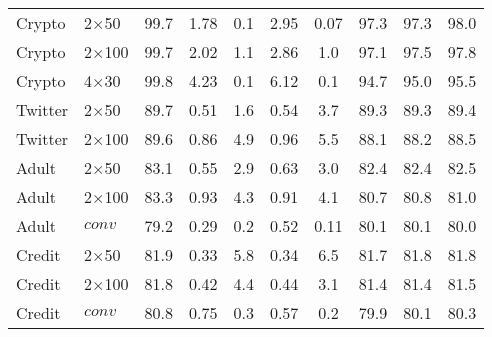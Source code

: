 {\begin{table}[t]
\begin{center}
\begin{tabular}{lll ccccccc}
\midrule
Crypto   & 2$\times$50    &  99.7   &    1.78&  0.1   & 2.95  & 0.07           & 97.3    &   97.3 &   98.0            \\ 
Crypto   & 2$\times$100    &  99.7   &    2.02& 1.1   & 2.86 & 1.0            & 97.1    &   97.5 &   97.8             \\   
Crypto   & 4$\times$30    &  99.8   &    4.23 & 0.1 & 6.12 & 0.1              & 94.7    &   95.0 &   95.5            \\     
\midrule
Twitter   & 2$\times$50   &  89.7   &    0.51 & 1.6 & 0.54  & 3.7             & 89.3    &   89.3 &   89.4                \\  
Twitter   & 2$\times$100   &  89.6   &   0.86 & 4.9 & 0.96  & 5.5            & 88.1    &   88.2 &   88.5            \\ 
\midrule
Adult   & 2$\times$50   &  83.1   &    0.55  & 2.9& 0.63  & 3.0               & 82.4    &   82.4 &   82.5           \\     

Adult   & 2$\times$100  &  83.3   &    0.93 &  4.3& 0.91 & 4.1               & 80.7    &   80.8 &   81.0                 \\ 

Adult   & $conv$ &  79.2   &    0.29    & 0.2& 0.52 & 0.11                  & 80.1    &   80.1 &   80.0               \\ 
\midrule
Credit   & 2$\times$50    &  81.9   &    0.33 &  5.8  & 0.34  & 6.5         & 81.7    &   81.8 &   81.8                 \\ 
Credit   & 2$\times$100   &  81.8   &    0.42  & 4.4  & 0.44  & 3.1          & 81.4    &   81.4 &   81.5             \\ 
Credit   & $conv$  &  80.8   &    0.75&  0.3  & 0.57   & 0.2                & 79.9    &   80.1 &   80.3                  \\     
\bottomrule        
\end{tabular}
    \label{tab:results}
\quad
\end{center}
\end{table} 

}
